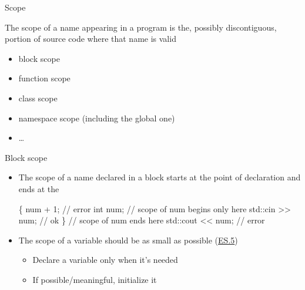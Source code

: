\begin{frame}{Scope}

  The scope of a name appearing in a program is the, possibly
  discontiguous, portion of source code where that name is valid

  \begin{itemize}
  \item block scope
  \item function scope
  \item class scope
  \item namespace scope (including the global one)
  \item \ldots
  \end{itemize}

\end{frame}

\begin{frame}[fragile]{Block scope}

  \begin{itemize}[<+->]
  \item The scope of a name declared in a block starts at the point of
    declaration and ends at the \code{\}}

    \begin{codeblock}
\{
  num + 1;         // error
  int num;         // scope of num begins only here
  std::cin >> num; // ok
\}                  // scope of num ends here
std::cout <{}< num;  // error\end{codeblock}

  \item<2-> The scope of a variable should be as small as possible
   (\href{https://isocpp.github.io/CppCoreGuidelines/CppCoreGuidelines#es5-keep-scopes-small}{ES.5})
    \begin{itemize}
    \item Declare a variable only when it's needed
    \item If possible/meaningful, initialize it
    \end{itemize}
  \end{itemize}

\end{frame}

